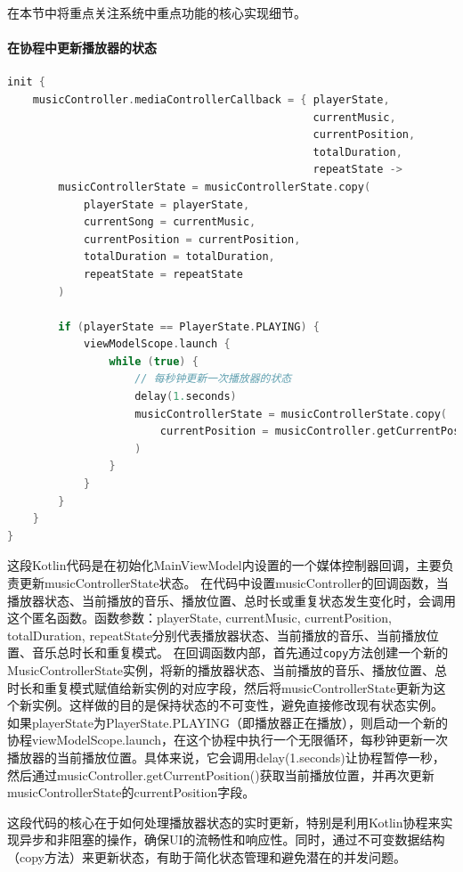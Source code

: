 \documentclass[main.tex]{subfiles}
\begin{document}
在本节中将重点关注系统中重点功能的核心实现细节。

\paragraph{在协程中更新播放器的状态}

\begin{lstlisting}[language=Kotlin]
init {
    musicController.mediaControllerCallback = { playerState,
                                                currentMusic,
                                                currentPosition,
                                                totalDuration,
                                                repeatState ->
        musicControllerState = musicControllerState.copy(
            playerState = playerState,
            currentSong = currentMusic,
            currentPosition = currentPosition,
            totalDuration = totalDuration,
            repeatState = repeatState
        )

        if (playerState == PlayerState.PLAYING) {
            viewModelScope.launch {
                while (true) {
                    // 每秒钟更新一次播放器的状态
                    delay(1.seconds)
                    musicControllerState = musicControllerState.copy(
                        currentPosition = musicController.getCurrentPosition()
                    )
                }
            }
        }
    }
}
\end{lstlisting}

这段Kotlin代码是在初始化MainViewModel内设置的一个媒体控制器回调，主要负责更新musicControllerState状态。
在代码中设置musicController的回调函数，当播放器状态、当前播放的音乐、播放位置、总时长或重复状态发生变化时，会调用这个匿名函数。函数参数：playerState, currentMusic, currentPosition, totalDuration, repeatState分别代表播放器状态、当前播放的音乐、当前播放位置、音乐总时长和重复模式。
在回调函数内部，首先通过\texttt{copy}方法创建一个新的MusicControllerState实例，将新的播放器状态、当前播放的音乐、播放位置、总时长和重复模式赋值给新实例的对应字段，然后将musicControllerState更新为这个新实例。这样做的目的是保持状态的不可变性，避免直接修改现有状态实例。
如果playerState为PlayerState.PLAYING（即播放器正在播放），则启动一个新的协程viewModelScope.launch，在这个协程中执行一个无限循环，每秒钟更新一次播放器的当前播放位置。具体来说，它会调用delay(1.seconds)让协程暂停一秒，然后通过musicController.getCurrentPosition()获取当前播放位置，并再次更新musicControllerState的currentPosition字段。

这段代码的核心在于如何处理播放器状态的实时更新，特别是利用Kotlin协程来实现异步和非阻塞的操作，确保UI的流畅性和响应性。同时，通过不可变数据结构（copy方法）来更新状态，有助于简化状态管理和避免潜在的并发问题。
\end{document}
